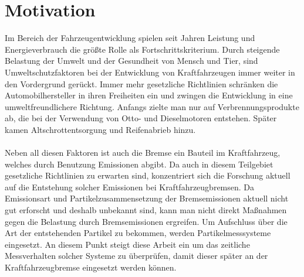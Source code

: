 \section{Motivation}
Im Bereich der Fahrzeugentwicklung spielen seit Jahren Leistung und Energieverbrauch die gr\"{o}{\ss}te Rolle als Fortschrittskriterium. Durch steigende Belastung der Umwelt und der Gesundheit von Mensch und Tier, sind Umweltschutzfaktoren bei der Entwicklung von Kraftfahrzeugen immer weiter in den Vordergrund ger\"{u}ckt. Immer mehr gesetzliche Richtlinien schr\"{a}nken die Automobilhersteller in ihren Freiheiten ein und zwingen die Entwicklung in eine umweltfreundlichere Richtung. Anfangs zielte man nur auf Verbrennungsprodukte ab, die bei der Verwendung von Otto- und Dieselmotoren entstehen. Sp\"{a}ter kamen Altschrottentsorgung und Reifenabrieb hinzu. 
\\\\
Neben all diesen Faktoren ist auch die Bremse ein Bauteil im Kraftfahrzeug, welches durch Benutzung Emissionen abgibt. Da auch in diesem Teilgebiet gesetzliche Richtlinien zu erwarten sind, konzentriert sich die Forschung aktuell auf die Entstehung solcher Emissionen bei Kraftfahrzeugbremsen. Da Emissionsart und Partikelzusammensetzung der Bremsemissionen aktuell nicht gut erforscht und deshalb unbekannt sind, kann man nicht direkt Ma{\ss}nahmen gegen die Belastung durch Bremsemissionen ergreifen. Um Aufschluss \"{u}ber die Art der entstehenden Partikel zu bekommen, werden Partikelmesssysteme eingesetzt. An diesem Punkt steigt diese Arbeit ein um das zeitliche Messverhalten solcher Systeme zu \"{u}berpr\"{u}fen, damit dieser sp\"{a}ter an der Kraftfahrzeugbremse eingesetzt werden k\"{o}nnen.